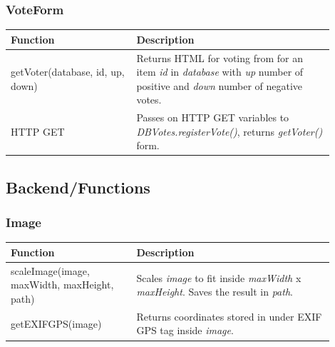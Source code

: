 \subsubsection{VoteForm}
\begin{minipage}{\linewidth}
  \centering
  \setlength{\tabcolsep}{12pt}
  \begin{tabular}{|p{0.35\linewidth}|p{0.55\linewidth}|}
  \hline
  \cellcolor{gray!25} Function & \cellcolor{gray!25} Description \\
  \hline
  getVoter(database, id, up, down) & Returns HTML for voting from for an item \textit{id} in \textit{database} with \textit{up} number of positive and \textit{down} number of negative votes. \\
  HTTP GET & Passes on HTTP GET variables to \textit{DBVotes.registerVote()}, returns \textit{getVoter()} form. \\
  \hline
  \end{tabular}
\end{minipage}

\subsection{Backend/Functions}
\label{subsec:CodeDetailsBackendFunctions}

\subsubsection{Image}
\begin{minipage}{\linewidth}
  \centering
  \setlength{\tabcolsep}{12pt}
  \begin{tabular}{|p{0.35\linewidth}|p{0.55\linewidth}|}
  \hline
  \cellcolor{gray!25} Function & \cellcolor{gray!25} Description \\
  \hline
  scaleImage(image, maxWidth, maxHeight, path) & Scales \textit{image} to fit inside \textit{maxWidth} x \textit{maxHeight}. Saves the result in \textit{path}. \\
  getEXIFGPS(image) & Returns coordinates stored in under EXIF GPS tag inside \textit{image}. \\
  \hline
  \end{tabular}
\end{minipage}

